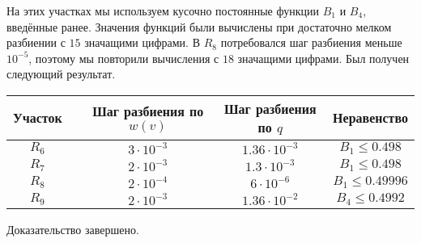 На этих участках мы используем кусочно постоянные функции $B_1$ и $B_4$, введённые ранее.
Значения функций были вычислены при достаточно мелком разбиении с $15$ значащими цифрами.
В $R_8$ потребовался шаг разбиения меньше $10^{-5}$, поэтому мы повторили вычисления с $18$ значащими цифрами.
Был получен следующий результат.

\begin{center}
\begin{tabular} {|c|c|c|c|c|}
\hline
Участок & & Шаг разбиения по $w(v)$ & Шаг разбиения по $q$ & Неравенство \\
\hline
$R_6$   & & $3 \cdot 10^{-3}$       & $1.36 \cdot 10^{-3}$ & $B_1 \le 0.498$ \\
\hline
$R_7$   & & $2 \cdot 10^{-3}$       & $1.3 \cdot 10^{-3}$  & $B_1 \le 0.498$ \\
\hline
$R_8$   & & $2 \cdot 10^{-4}$       & $6 \cdot 10^{-6}$    & $B_1 \le 0.49996$ \\
\hline
$R_9$   & & $2 \cdot 10^{-3}$       & $1.36 \cdot 10^{-2}$ & $B_4 \le 0.4992$ \\
\hline
\end{tabular}
\end{center}

Доказательство завершено.
